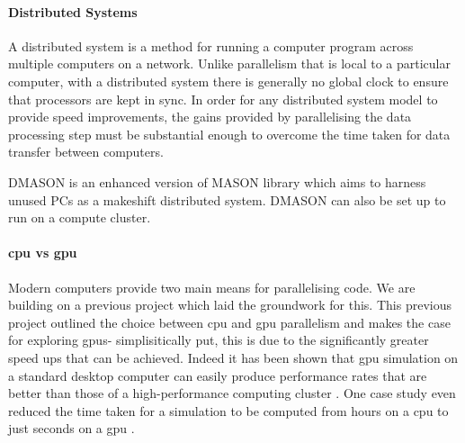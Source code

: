 \documentclass{UoYCSproject}
\begin{document}
\paragraph{Distributed Systems}
A distributed system is a method for running a computer program across multiple computers on a network.
Unlike parallelism that is local to a particular computer, with a distributed system there is generally no global clock to ensure that processors are kept in sync.
In order for any distributed system model to provide speed improvements, the gains provided by parallelising the data processing step must be substantial enough to overcome the time taken for data transfer between computers.

DMASON is an enhanced version of \gls{MASON} library which aims to harness unused PCs as a makeshift distributed system.
DMASON can also be set up to run on a compute cluster.

\paragraph{\acrshort{cpu} vs \acrshort{gpu}}
\label{cpu_v_gpu}
Modern computers provide two main means for parallelising code.
We are building on a previous project \cite{phil_diss} which laid the groundwork for this.
This previous project outlined the choice between \acrshort{cpu} and \acrshort{gpu} parallelism and makes the case for exploring \acrshort{gpu}s- simplisitically put, this is due to the significantly greater speed ups that can be achieved.
Indeed it has been shown that \acrshort{gpu} simulation on a standard desktop computer can easily produce performance rates that are better than those of a high-performance computing cluster \cite{flame_simulation}.
One case study even reduced the time taken for a simulation to be computed from hours on a \acrshort{cpu} to just seconds on a \acrshort{gpu} \cite{flame_keratinocyte}.
\end{document}
